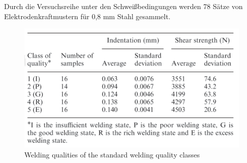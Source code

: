 \documentclass[english,ngerman]{tudscrreprt}
\begin{document}
Durch die Versuchsreihe unter den Schweißbedingungen werden 78 Sätze von Elektrodenkraftmustern für 0,8 mm Stahl gesammelt.
\begin{figure}[H]
\centering
\includegraphics[scale = 0.7]{./Bilder/Welding qualities of the standard welding quality classes.png}
\caption{Welding qualities of the standard welding quality classes}\label{fgg:T}
\end{figure}
\end{document}
